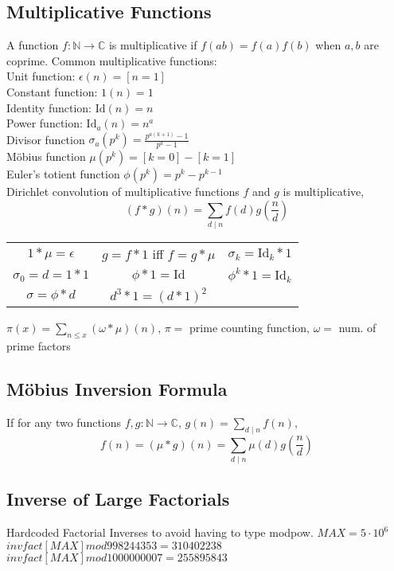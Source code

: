 \subsection{Multiplicative Functions}
A function $f : \mathbb{N} \to \mathbb{C}$ is multiplicative if
$f(ab) = f(a)f(b)$ when $a, b$ are coprime.
Common multiplicative functions: \\
Unit function: $\epsilon(n) = [n = 1]$ \\
Constant function: $1(n) = 1$ \\ 
Identity function: $\mathrm{Id}(n) = n$ \\
Power function: $\mathrm{Id}_a(n) = n^a$ \\
Divisor function $\sigma_a(p^k) = \frac{p^{a(k+1)} - 1}{p^a - 1}$ \\
Möbius function $\mu(p^k) = [k = 0] - [k = 1]$ \\
Euler's totient function $\phi(p^k) = p^k - p^{k-1}$ \\
Dirichlet convolution of multiplicative functions $f$ and $g$ is multiplicative,
\[ (f*g)(n) = \sum_{d \mid n} f(d) g\left(\frac{n}{d}\right) \]
\begin{center}
    \begin{tabular}{ c c c }
        $1 * \mu = \epsilon$ & $g = f * 1$ iff $f = g * \mu$ & $\sigma_k = \mathrm{Id}_k * 1$ \\
        $\sigma_0 = d = 1 * 1$ & $\phi * 1 = \mathrm{Id}$ & $\phi^k * 1 = \mathrm{Id}_k$ \\
        $\sigma = \phi * d$ & $d^3 * 1 = (d * 1)^2$ & 
    \end{tabular}
\end{center}
$\pi(x) = \sum_{n \leq x} (\omega * \mu)(n)$, $\pi = $ prime counting function, $\omega = $ num. of prime factors \\
\subsection{Möbius Inversion Formula}
    If for any two functions $f, g : \mathbb{N} \to \mathbb{C}$, $g(n) = \sum_{d \mid n} f(n)$,
    \[ f(n) = (\mu * g)(n) = \sum_{d \mid n} \mu(d) g \left(\frac{n}{d}\right) \]
\subsection{Inverse of Large Factorials}
    Hardcoded Factorial Inverses to avoid having to type modpow. $MAX = 5\cdot10^6$
    $ invfact[MAX] mod 998244353 = 310402238 $
    $ invfact[MAX] mod 1000000007 = 255895843 $

